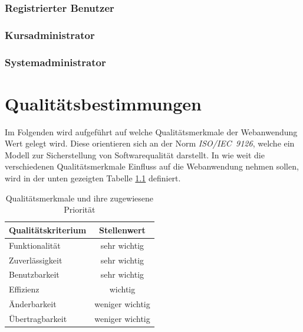 \documentclass[a4paper]{scrreprt}
\begin{document}
            
            
        \subsection{Registrierter Benutzer}
             
            
            
        \subsection{Kursadministrator}
            
             
            
        \subsection{Systemadministrator}
           
            
            
            
         
\chapter{Qualitätsbestimmungen}
Im Folgenden wird aufgeführt auf welche Qualitätsmerkmale der Webanwendung Wert gelegt wird. Diese orientieren sich an der Norm \textit{ISO/IEC~9126}, welche ein Modell zur Sicherstellung von Softwarequalität darstellt. In wie weit die verschiedenen Qualitätsmerkmale Einfluss auf die Webanwendung nehmen sollen, wird in der unten gezeigten Tabelle \ref{qTabelle} definiert.\\

\begin{table}[h]
 
    \begin{center}
    \begin{tabular}{|l|c|}
    \hline 
    \rule[-1ex]{0pt}{2.5ex} \textbf{Qualitätskriterium} & \textbf{Stellenwert} \\ 
    \hline 
    \rule[-1ex]{0pt}{2.5ex} Funktionalität & sehr wichtig \\ 
    \hline 
    \rule[-1ex]{0pt}{2.5ex} Zuverlässigkeit & sehr wichtig \\ 
    \hline 
    \rule[-1ex]{0pt}{2.5ex} Benutzbarkeit & sehr wichtig \\ 
    \hline 
    \rule[-1ex]{0pt}{2.5ex} Effizienz & wichtig \\ 
    \hline 
    \rule[-1ex]{0pt}{2.5ex} Änderbarkeit & weniger wichtig \\ 
    \hline 
    \rule[-1ex]{0pt}{2.5ex} Übertragbarkeit & weniger wichtig \\ 
    \hline   
    \end{tabular}  
    \end{center}
    \caption{Qualitätsmerkmale und ihre zugewiesene Priorität} 
    \label{qTabelle}   
\end{table}
    
\end{document}
